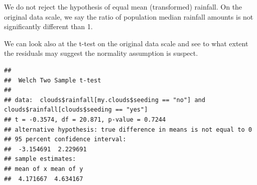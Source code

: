 \documentclass[
]{book}
\newenvironment{Shaded}{\begin{snugshade}}{\end{snugshade}}
\newcommand{\AttributeTok}[1]{\textcolor[rgb]{0.77,0.63,0.00}{#1}}
\newcommand{\FunctionTok}[1]{\textcolor[rgb]{0.00,0.00,0.00}{#1}}
\newcommand{\NormalTok}[1]{#1}
\newcommand{\OtherTok}[1]{\textcolor[rgb]{0.56,0.35,0.01}{#1}}
\newcommand{\SpecialCharTok}[1]{\textcolor[rgb]{0.00,0.00,0.00}{#1}}
\newcommand{\StringTok}[1]{\textcolor[rgb]{0.31,0.60,0.02}{#1}}
\begin{document}
We do not reject the hypothesis of equal mean (transformed) rainfall. On the original data scale, we say the ratio of population median rainfall amounts is not significantly different than 1.

We can look also at the t-test on the original data scale and see to what extent the residuals may suggest the normality assumption is suspect.

\begin{Shaded}
\end{Shaded}

\begin{verbatim}
## 
##  Welch Two Sample t-test
## 
## data:  clouds$rainfall[my.clouds$seeding == "no"] and clouds$rainfall[clouds$seeding == "yes"]
## t = -0.3574, df = 20.871, p-value = 0.7244
## alternative hypothesis: true difference in means is not equal to 0
## 95 percent confidence interval:
##  -3.154691  2.229691
## sample estimates:
## mean of x mean of y 
##  4.171667  4.634167
\end{verbatim}
\end{document}
